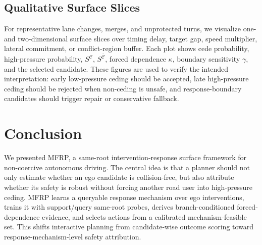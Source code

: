 \documentclass[10pt]{article}
\newcommand{\framework}{MFRP}
\newcommand{\cC}{\mathcal{C}}
\begin{document}
\begin{table}[t]
\centering
\caption{Robustness under simulator-policy and stress-condition shifts. Values are placeholders.}
\label{tab:robustness}
\end{table}

\subsection{Qualitative Surface Slices}
\label{sec:exp_qualitative}

For representative lane changes, merges, and unprotected turns, we visualize one- and two-dimensional surface slices over timing delay, target gap, speed multiplier, lateral commitment, or conflict-region buffer. Each plot shows cede probability, high-pressure probability, \(S^{\cC}\), \(S^{\bar{\cC}}\), forced dependence \(\kappa\), boundary sensitivity \(\gamma\), and the selected candidate. These figures are used to verify the intended interpretation: early low-pressure ceding should be accepted, late high-pressure ceding should be rejected when non-ceding is unsafe, and response-boundary candidates should trigger repair or conservative fallback.


\section{Conclusion}

We presented \framework{}, a same-root intervention-response surface framework for non-coercive autonomous driving. The central idea is that a planner should not only estimate whether an ego candidate is collision-free, but also attribute whether its safety is robust without forcing another road user into high-pressure ceding. \framework{} learns a queryable response mechanism over ego interventions, trains it with support/query same-root probes, derives branch-conditioned forced-dependence evidence, and selects actions from a calibrated mechanism-feasible set. This shifts interactive planning from candidate-wise outcome scoring toward response-mechanism-level safety attribution.
\end{document}
